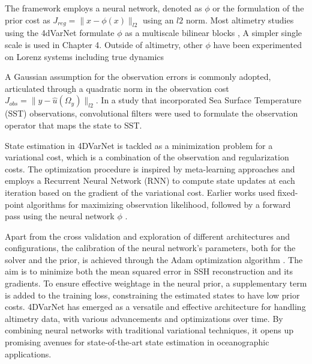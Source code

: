 \begin{bibunit}
The framework employs a neural network, denoted as  $\phi$  or the formulation of the prior cost as $J_{reg}= \|x - \phi(x)\|_{l2}$ using an $l2$ norm.
Most altimetry studies using the 4dVarNet formulate $\phi$ as a multiscale bilinear blocks \cite{fabletBilinearResidualNeural2018}, A simpler single scale is used in Chapter 4. Outside of altimetry, other $\phi$ have been experimented on Lorenz systems including true dynamics\cite{fabletLearningVariationalData2021}

A Gaussian assumption for the observation errors is commonly adopted, articulated through a quadratic norm in the observation cost $J_{obs}= \|y - \hat{u}(\Omega_y)\|_{l2}$. In a study that incorporated Sea Surface Temperature (SST) observations\cite{fabletMultimodal4DVarNetsReconstruction2023}, convolutional filters were used to formulate the observation operator that maps the state to SST.


State estimation in 4DVarNet is tackled as a minimization problem for a variational cost, which is a combination of the observation and regularization costs. The optimization procedure is inspired by meta-learning approaches and employs a Recurrent Neural Network (RNN) to compute state updates at each iteration based on the gradient of the variational cost\cite{fabletENDTOENDPHYSICSINFORMEDREPRESENTATION2021}. Earlier works used fixed-point algorithms for maximizing observation likelihood, followed by a forward pass using the neural network $\phi$ \cite{beauchampDatadrivenLearningbasedInterpolations2021}. 

Apart from the cross validation and exploration of different architectures and configurations, the calibration of the neural network's parameters, both for the solver and the prior, is achieved through the Adam optimization algorithm \cite{kingmaAdamMethodStochastic2017}. The aim is to minimize both the mean squared error in SSH reconstruction and its gradients. To ensure effective weightage in the neural prior, a supplementary term is added to the training loss, constraining the estimated states to have low prior costs.
4DVarNet has emerged as a versatile and effective architecture for handling altimetry data, with various advancements and optimizations over time. By combining neural networks with traditional variational techniques, it opens up promising avenues for state-of-the-art state estimation in oceanographic applications.

\end{bibunit}

